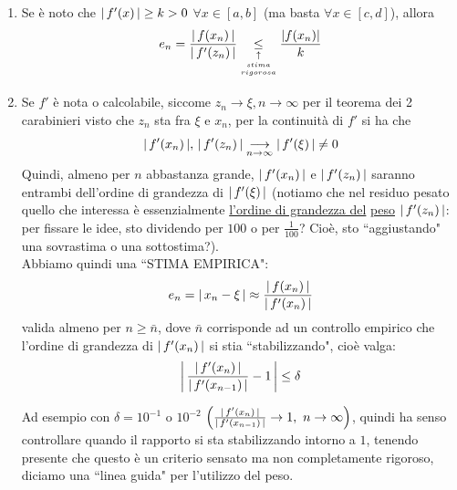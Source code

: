 \begin{enumerate}[label=\roman*)]
\item Se è noto che $\abs{\,f'(x)\,} \ge k >0$ $\forall x \in [a,b]$ (ma basta $\forall x \in [c,d]$), allora
\[e_n = \frac{\abs{\,f(x_n)\,}}{\abs{\,f'(z_n)\,}} \underset{\underset{\underset{rigorosa}{stima}}{\uparrow}}{\le} \frac{|f(x_n)|}{k} \]

\item Se $f'$ è nota o calcolabile, siccome $z_n \to \xi, n \to \infty$ per il teorema dei 2 carabinieri visto che $z_n$ sta fra $\xi$ e $x_n$, per la continuità di $f'$ si ha che
\[ \abs{\,f'(x_n)\,}, \, \abs{\,f'(z_n)\,} \underset{n \to \infty}{\longrightarrow} \abs{\,f'(\xi)\,} \ne 0 \]
Quindi, almeno per $n$ abbastanza grande, $\abs{\,f'(x_n)\,}$ e $\abs{\,f'(z_n)\,}$  saranno entrambi dell'ordine di grandezza di $\abs{\,f'(\xi)\,}$ (notiamo che nel residuo pesato quello che interessa è essenzialmente \uline{l'ordine di grandezza del} \uline{peso} $\abs{\,f'(z_n)\,}$: per fissare le idee, sto dividendo per $100$ o per $\frac{1}{100}$? Cioè, sto ``aggiustando" una sovrastima o una sottostima?).\\
Abbiamo quindi una ``STIMA EMPIRICA":
\[ e_n = \abs{\,x_n-\xi\,} \approx \frac{\abs{\,f(x_n)\,}}{\abs{\,f'(x_n)\,}} \] 
valida almeno per $n \ge \bar{n}$, dove $\bar{n}$ corrisponde ad un controllo empirico che l'ordine di grandezza di $\abs{\,f'(x_n)\,}$ si stia ``stabilizzando", cioè valga:
\[ \abs*{\,\frac{\abs{\,f'(x_n)\,}}{\abs{\,f'(x_{n-1})\,}}-1\,} \le \delta \]


Ad esempio con $\delta = 10^{-1}$ o $10^{-2}$ $\left(\frac{\abs{\,f'(x_n)\,}}{\abs{\,f'(x_{n-1})\,}} \to 1,\ n \to \infty \right)$, quindi ha senso controllare quando il rapporto si sta stabilizzando intorno a $1$, tenendo presente che questo è un criterio sensato ma non completamente rigoroso, diciamo una ``linea guida" per l'utilizzo del peso.


\end{enumerate}
